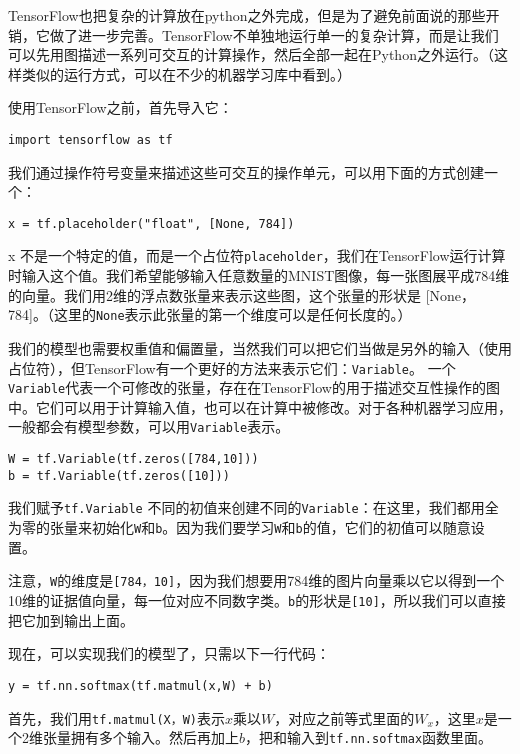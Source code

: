 TensorFlow也把复杂的计算放在python之外完成，但是为了避免前面说的那些开销，它做了进一步完善。TensorFlow不单独地运行单一的复杂计算，而是让我们可以先用图描述一系列可交互的计算操作，然后全部一起在Python之外运行。（这样类似的运行方式，可以在不少的机器学习库中看到。）

使用TensorFlow之前，首先导入它：
\begin{lstlisting}
import tensorflow as tf
\end{lstlisting}
我们通过操作符号变量来描述这些可交互的操作单元，可以用下面的方式创建一个：
\begin{lstlisting}
x = tf.placeholder("float", [None, 784])
\end{lstlisting}
x 不是一个特定的值，而是一个占位符\lstinline{placeholder}，我们在TensorFlow运行计算时输入这个值。我们希望能够输入任意数量的MNIST图像，每一张图展平成784维的向量。我们用2维的浮点数张量来表示这些图，这个张量的形状是 [None，784]。（这里的\lstinline{None}表示此张量的第一个维度可以是任何长度的。）

我们的模型也需要权重值和偏置量，当然我们可以把它们当做是另外的输入（使用占位符），但TensorFlow有一个更好的方法来表示它们：\lstinline{Variable}。 一个\lstinline{Variable}代表一个可修改的张量，存在在TensorFlow的用于描述交互性操作的图中。它们可以用于计算输入值，也可以在计算中被修改。对于各种机器学习应用，一般都会有模型参数，可以用\lstinline{Variable}表示。

\begin{lstlisting}
W = tf.Variable(tf.zeros([784,10]))
b = tf.Variable(tf.zeros([10]))
\end{lstlisting}

我们赋予\lstinline{tf.Variable} 不同的初值来创建不同的\lstinline{Variable}：在这里，我们都用全为零的张量来初始化\lstinline{W}和\lstinline{b}。因为我们要学习\lstinline{W}和\lstinline{b}的值，它们的初值可以随意设置。

注意，\lstinline{W}的维度是\lstinline{[784，10]}，因为我们想要用784维的图片向量乘以它以得到一个10维的证据值向量，每一位对应不同数字类。\lstinline{b}的形状是\lstinline{[10]}，所以我们可以直接把它加到输出上面。

现在，可以实现我们的模型了，只需以下一行代码：

\begin{lstlisting}
y = tf.nn.softmax(tf.matmul(x,W) + b)
\end{lstlisting}

首先，我们用\lstinline{tf.matmul(X，W)}表示$x$乘以$W$，对应之前等式里面的$W_x$，这里$x$是一个2维张量拥有多个输入。然后再加上$b$，把和输入到\lstinline{tf.nn.softmax}函数里面。

